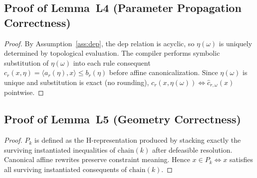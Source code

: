 ﻿\documentclass[a4paper,fleqn]{cas-dc}
\newcommand{\chain}{\mathrm{chain}}
\begin{document}
\subsection{Proof of Lemma~L4 (Parameter Propagation Correctness)}

\begin{proof}
By Assumption~\ref{ass:dep}, the \textsf{dep} relation is acyclic, so $\eta(\omega)$
is uniquely determined by topological evaluation.
The compiler performs symbolic substitution of $\eta(\omega)$ into
each rule consequent $c_r(x,\eta) = \langle a_r(\eta),x\rangle \leq b_r(\eta)$
before affine canonicalization.
Since $\eta(\omega)$ is unique and substitution is exact (no rounding),
$c_r(x,\eta(\omega)) \iff \hat{c}_{r,\omega}(x)$ pointwise.  
\end{proof}

\subsection{Proof of Lemma~L5 (Geometry Correctness)}

\begin{proof}
$P_k$ is defined as the H-representation produced by stacking exactly the
surviving instantiated inequalities of $\chain(k)$ after defeasible resolution.
Canonical affine rewrites preserve constraint meaning.
Hence $x\in P_k \iff x$ satisfies all surviving instantiated consequents of $\chain(k)$.  
\end{proof}



\end{document}
